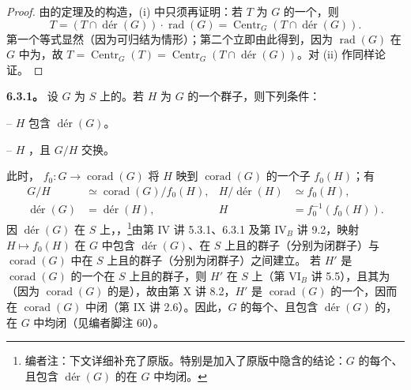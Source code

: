 \begin{proof}
由的定理及的构造，(i) 中只须再证明：若 $T$ 为 $G$ 的一个，则
\[T=(T\cap\operatorname{d\text{é}r}(G))\cdot\operatorname{rad}(G)
=\operatorname{Centr}_G(T\cap\operatorname{d\text{é}r}(G)).\]
第一个等式显然（因为可归结为情形）；第二个立即由此得到，因为 $\operatorname{rad}(G)$ 在 $G$ 中为，故 $T=\operatorname{Centr}_G(T)=\operatorname{Centr}_G(T\cap\operatorname{d\text{é}r}(G))$。对 (ii) 作同样论证。
\end{proof}
\textbf{6.3.1。} 设 $G$ 为 $S$ 上的。若 $H$ 为 $G$ 的一个群子，则下列条件：

-- $H$ 包含 $\operatorname{d\text{é}r}(G)$。

-- $H$ ，且 $G/H$ 交换。

此时， $f_0:G\to\operatorname{corad}(G)$ 将 $H$ 映到 $\operatorname{corad}(G)$ 的一个子 $f_0(H)$；有
\[\begin{aligned}
G/H&\simeq\operatorname{corad}(G)/f_0(H),&
H/\operatorname{d\text{é}r}(H)&\simeq f_0(H),\\
\operatorname{d\text{é}r}(G)&=\operatorname{d\text{é}r}(H),&
H&=f_0^{-1}(f_0(H)).
\end{aligned}\]
因 $\operatorname{d\text{é}r}(G)$ 在 $S$ 上，，\footnote{编者注：下文详细补充了原版。特别是加入了原版中隐含的结论：$G$ 的每个、且包含 $\operatorname{d\text{é}r}(G)$ 的在 $G$ 中均闭。}由第 IV 讲 5.3.1、6.3.1 及第 IV$_B$ 讲 9.2，映射 $H\mapsto f_0(H)$ 在 $G$ 中包含 $\operatorname{d\text{é}r}(G)$、在 $S$ 上且的群子（分别为闭群子）与 $\operatorname{corad}(G)$ 中在 $S$ 上且的群子（分别为闭群子）之间建立。
若 $H'$ 是 $\operatorname{corad}(G)$ 的一个在 $S$ 上且的群子，则 $H'$ 在 $S$ 上（第 VI$_B$ 讲 5.5），且其为（因为 $\operatorname{corad}(G)$ 的是），故由第 X 讲 8.2，$H'$ 是 $\operatorname{corad}(G)$ 的一个，因而在 $\operatorname{corad}(G)$ 中闭（第 IX 讲 2.6）。因此，$G$ 的每个、且包含 $\operatorname{d\text{é}r}(G)$ 的，在 $G$ 中均闭（见编者脚注 60）。

